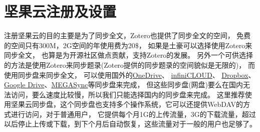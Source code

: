 \documentclass[theorem=false,mathfont=none,openany,sub3section]{easybook}
\begin{document}
\section{坚果云注册及设置}\label{sec:jianguoReg}
注册坚果云的目的主要是为了同步全文，Zotero也提供了同步全文的空间，
免费的空间只有300M，2G空间的年使用费为20\$，
如果是土豪可以选择使用Zotero来同步全文，
也算是为开源社区做点贡献，支持Zotero的发展。
另外一个可供选择的方法是使用Zotero来同步题录(Zotero提供的同步题录的空间貌似是无限的)，
而使用同步盘来同步全文，
可以使用国外的\href{https://office.live.com/start/OneDrive.aspx}{OneDrive}、
\href{https://infini-cloud.net/en/index.html}{infiniCLOUD}、
\href{https://www.dropbox.com/}{Dropbox}、
\href{https://www.google.com/drive/}{Google Drive}、\href{https://mega.nz/}{MEGASync}等同步盘来完成，
但这些同步盘(网盘)要么在国内无法访问，要么速度比较慢，所以我们只能选择国内的同步盘来完成。 
这里推荐使用坚果云同步盘，这个同步盘也支持多个操作系统，它可以还提供WebDAV的方式进行访问，对于普通用户，
它提供每个月1G的上传流量，3G的下载流量，超过以后停止上传或下载，到下个月后自动恢复，这些流量对于一般的用户也足够了。
\end{document}
